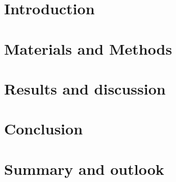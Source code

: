\documentclass[english,numbers=noenddot,bibtotoc,11pt]{scrreprt}
\newcommand{\Abkuerzung}{
\printnomenclature
\newpage
    }
\begin{document}
\newpage

\tableofcontents

\listoffigures

\listoftables

%
		






\renewcommand{\thepage}{\arabic{page}}
\setcounter{page}{1}

\chapter{Introduction}

\chapter{Materials and Methods}


\chapter{Results and discussion}


\chapter{Conclusion}

\chapter{Summary and outlook}






\end{document}
